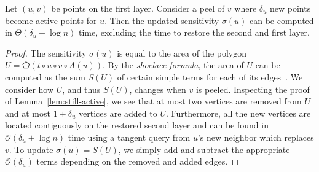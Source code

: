 \documentclass{cccg24}
\newcommand{\Oh}[1]{\mathcal{O}\!\lrParents{#1}}
\newcommand{\OhTheta}[1]{\Theta\!\lrParents{#1}}
\newcommand{\lrParents}[1]{\left( #1 \right)}
\newcommand{\logn}{\log{n}}
\newcommand{\Tri}[3]{\triangle #1#2#3}
\newcommand{\sens}[1]{\sigma\!\lrParents{#1}}
\newcommand{\hp}[1]{\overrightarrow{#1}}
\newcommand{\poly}[1]{\pentagon\!\lrParents{#1}}
\begin{document}
\begin{lemma}\label{lem:update-sensitivities}
    Let $(u, v)$ be points on the first layer. Consider a peel of $v$ where $\delta_u$ new points become active points for $u$.
    Then the updated sensitivity $\sens{u}$ can be computed in $\OhTheta{\delta_u + \log n}$ time, excluding the time to restore the second and first layer. %
\end{lemma}
\begin{proof}
    The sensitivity $\sens{u}$ is equal to the area of the polygon $U = \poly{t \circ u \circ v \circ A(u)}$.
    By the \emph{shoelace formula}, the area of $U$ can be computed as the sum $S(U)$ of certain simple terms for each of its edges~\cite{2000_boland_Urrutia_polygon_chord_area_static, contreras1998cutting}. 
    We consider how $U$, and thus $S(U)$, changes when $v$ is peeled. 
    Inspecting the proof of Lemma~\ref{lem:still-active}, we see that at most two vertices are removed from $U$ and at most $1 + \delta_u$ vertices are added to $U$. 
    Furthermore, all the new vertices are located contiguously on the restored second layer and can be found in $\Oh{\delta_u + \logn}$ time using a tangent query from $u$'s new neighbor which replaces $v$.
    To update $\sens{u} = S(U)$, we simply add and subtract the appropriate $\Oh{\delta_u}$ terms depending on the removed and added edges.
    



\end{proof}
\end{document}
